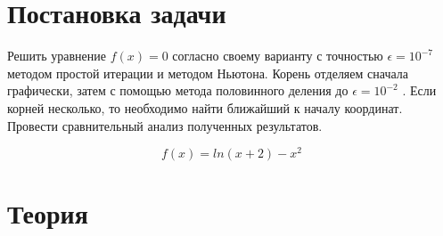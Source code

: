 \documentclass[12pt, a4paper]{article}
\begin{document}
	
	\begin{titlepage}
	\end{titlepage}

	\tableofcontents

	 \section{Постановка задачи}
	 Решить уравнение $f(x)=0$ согласно своему варианту с точностью $\epsilon = 10^{-7}$ методом простой итерации и методом Ньютона. Корень отделяем сначала графически, затем с помощью метода половинного деления до $\epsilon = 10^{-2}$ . Если корней несколько, то необходимо найти ближайший к началу координат. Провести сравнительный анализ полученных результатов.
	 
	 \begin{equation} \label{eqn:func}
	 	f(x)=ln(x+2)-x^2
	 \end{equation}
	 
	 \section{Теория}
	 
\end{document}
